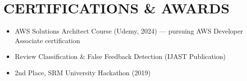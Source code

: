 \documentclass[letterpaper,10pt]{article}
\newcommand{\resumeItem}[1]{\item\small #1}
\begin{document}
\section{\textcolor{metablue}{CERTIFICATIONS \& AWARDS}}
\vspace{-5pt}
\begin{itemize}
\resumeItem{AWS Solutions Architect Course (Udemy, 2024) --- pursuing AWS Developer Associate certification}
\resumeItem{Review Classification \& False Feedback Detection (IJAST Publication)}
\resumeItem{2nd Place, SRM University Hackathon (2019)}
\end{itemize}
\end{document}
